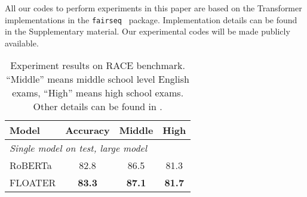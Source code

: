 \documentclass[11pt]{article}
\begin{document}
All our codes to perform experiments in this paper are based on the Transformer implementations in the \texttt{fairseq}~\cite{ott2019fairseq} package. Implementation details can be found in the Supplementary material. Our experimental codes will be made publicly available. 

\begin{table*}[htb]
    \centering
    \caption{Experimental results on GLUE benchmark}
    \label{tab:exp-GLUE}
     \end{table*}

\begin{table}[htb]
    \centering
    \caption{Experiment results on RACE benchmark. ``Middle'' means middle school level English exams, ``High'' means high school exams. Other details can be found in \cite{lai2017race}.}
    \label{tab:race-benchmark}
    \begin{tabular}{lccc}
    \toprule
    Model & Accuracy & Middle & High \\
    \midrule
    \multicolumn{4}{l}{\textit{Single model on test, large model}}\\
    RoBERTa      & 82.8  & 86.5 & 81.3 \\
    FLOATER & \textbf{83.3}  & \textbf{87.1} & \textbf{81.7} \\
    \bottomrule
    \end{tabular}
\end{table}
\end{document}
